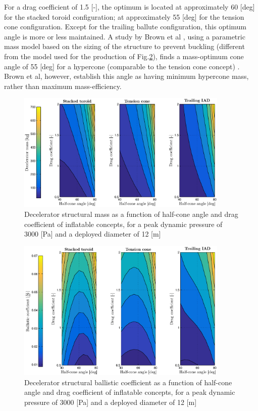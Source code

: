 For a drag coefficient of 1.5 [-], the optimum is located at approximately 60 [deg] for the stacked toroid configuration; at approximately 55 [deg] for the tension cone configuration. Except for the trailing ballute configuration, this optimum angle is more or less maintained. A study by Brown et al \cite{Brown2003}, using a parametric mass model based on the sizing of the structure to prevent buckling (different from the model used for the production of Fig.\ref{fig:bc_theta_cd}), finds a mass-optimum cone angle of 55 [deg] for a hypercone (comparable to the tension cone concept) \cite[p.6]{Brown2003}. Brown et al, however, establish this angle as having minimum hypercone mass, rather than maximum mass-efficiency. 
\begin{figure}[H]
\centering
\includegraphics[width = 0.9\textwidth]{Figure/mass_theta_cd.eps}
\caption{Decelerator structural mass as a function of half-cone angle and drag coefficient of inflatable concepts, for a peak dynamic pressure of 3000 [Pa] and a deployed diameter of 12 [m]}
\label{fig:mass_theta_cd}
\end{figure}

\begin{figure}[H]
\centering
\includegraphics[width = 0.9\textwidth]{Figure/bc_theta_cd.eps}
\caption{Decelerator structural ballistic coefficient as a function of half-cone angle and drag coefficient of inflatable concepts, for a peak dynamic pressure of 3000 [Pa] and a deployed diameter of 12 [m]}
\label{fig:bc_theta_cd}
\end{figure}